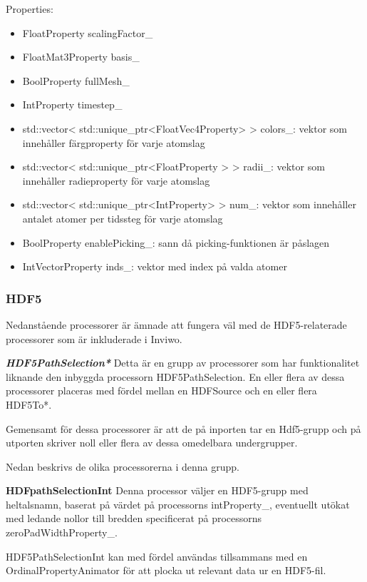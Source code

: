 \documentclass[a4paper,12pt]{article}
\begin{document}
Properties:
\begin{itemize}
\item FloatProperty scalingFactor\_
\item FloatMat3Property basis\_
\item BoolProperty fullMesh\_
\item IntProperty timestep\_
\item std::vector< std::unique\_ptr<FloatVec4Property> > colors\_: vektor som innehåller färgproperty för varje atomslag
\item std::vector< std::unique\_ptr<FloatProperty > > radii\_: vektor som innehåller radieproperty för varje atomslag
\item std::vector< std::unique\_ptr<IntProperty> > num\_: vektor som innehåller antalet atomer per tidssteg för varje atomslag
\item BoolProperty enablePicking\_: sann då picking-funktionen är påslagen 
\item IntVectorProperty inds\_: vektor med index på valda atomer
\end{itemize}

\subsubsection{HDF5}
\label{ch:hdf5-processorer}
Nedanstående processorer är ämnade att fungera väl med de HDF5-relaterade processorer som är inkluderade i Inviwo.

\textbf{\textit{HDF5PathSelection*}} \newline
Detta är en grupp av processorer som har funktionalitet liknande den inbyggda processorn HDF5PathSelection. En eller flera av dessa processorer placeras med fördel mellan en HDFSource och en eller flera HDF5To*.

Gemensamt för dessa processorer är  att de på inporten tar en Hdf5-grupp och på utporten skriver noll eller flera av dessa omedelbara undergrupper.

Nedan beskrivs de olika processorerna i denna grupp.

\textbf{HDFpathSelectionInt} \newline
Denna processor väljer en HDF5-grupp med heltalsnamn, baserat på värdet på processorns intProperty\_, eventuellt utökat med ledande nollor till bredden specificerat på processorns zeroPadWidthProperty\_.

HDF5PathSelectionInt kan med fördel användas tillsammans med en OrdinalPropertyAnimator för att plocka ut relevant data ur en HDF5-fil.
\end{document}
